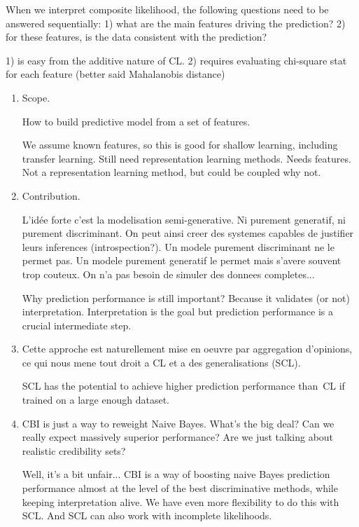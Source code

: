\documentclass[english]{scrartcl}
\begin{document}
When we interpret composite likelihood, the following questions need to be answered sequentially: 1) what are the main features driving the prediction? 2) for these features, is the data consistent with the prediction?

1) is easy from the additive nature of CL.
2) requires evaluating chi-square stat for each feature (better said Mahalanobis distance)




\begin{enumerate}
\item Scope.

How to build predictive model from a set of features.

We assume known features, so this is good for shallow learning, including transfer learning. Still need representation learning methods. Needs features. Not a representation learning method, but could be coupled why not.

\item Contribution. 
 
L'id\'ee forte c'est la modelisation semi-generative. Ni purement generatif, ni purement discriminant. On peut ainsi creer des systemes capables de justifier leurs inferences (introspection?). Un modele purement discriminant ne le permet pas. Un modele purement generatif le permet mais s'avere souvent trop couteux. On n'a pas besoin de simuler des donnees completes...

{\color{red} Why prediction performance is still important? Because it validates (or not) interpretation. Interpretation is the goal but prediction performance is a crucial intermediate step.}

\item Cette approche est naturellement mise en oeuvre par aggregation d'opinions, ce qui nous mene tout droit a CL et a des generalisations (SCL). 

SCL has the potential to achieve higher prediction performance than~CL if trained on a large enough dataset.

\item {\color{red}CBI is just a way to reweight Naive Bayes. What's the big deal? Can we really expect massively superior performance? Are we just talking about realistic credibility sets?}

Well, it's a bit unfair... CBI is a way of boosting naive Bayes prediction performance almost at the level of the best discriminative methods, while keeping interpretation alive. We have even more flexibility to do this with SCL. And SCL can also work with incomplete likelihoods.


\end{enumerate}
\end{document}
